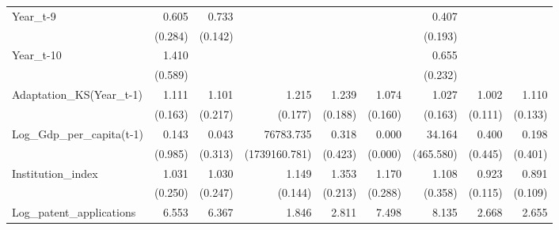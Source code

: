 \begin{table}[htbp]
\begin{tabular}{l*{8}{D{.}{.}{-1}}}
Year\_t-9            &       0.605         &       0.733\sym{\%}  &                     &                     &                     &       0.407\sym{*}  &                     &                     \\
                    &     (0.284)         &     (0.142)         &                     &                     &                     &     (0.193)         &                     &                     \\
Year\_t-10           &       1.410         &                     &                     &                     &                     &       0.655         &                     &                     \\
                    &     (0.589)         &                     &                     &                     &                     &     (0.232)         &                     &                     \\
Adaptation\_KS(Year\_t-1)&       1.111         &       1.101         &       1.215         &       1.239         &       1.074         &       1.027         &       1.002         &       1.110         \\
                    &     (0.163)         &     (0.217)         &     (0.177)         &     (0.188)         &     (0.160)         &     (0.163)         &     (0.111)         &     (0.133)         \\
Log\_Gdp\_per\_capita(t-1)&       0.143         &       0.043         &   76783.735         &       0.318         &       0.000\sym{**} &      34.164         &       0.400         &       0.198         \\
                    &     (0.985)         &     (0.313)         &(1739160.781)         &     (0.423)         &     (0.000)         &   (465.580)         &     (0.445)         &     (0.401)         \\
Institution\_index   &       1.031         &       1.030         &       1.149         &       1.353\sym{*}  &       1.170         &       1.108         &       0.923         &       0.891         \\
                    &     (0.250)         &     (0.247)         &     (0.144)         &     (0.213)         &     (0.288)         &     (0.358)         &     (0.115)         &     (0.109)         \\
Log\_patent\_applications&       6.553\sym{***}&       6.367\sym{***}&       1.846         &       2.811\sym{***}&       7.498\sym{***}&       8.135\sym{**} &       2.668\sym{***}&       2.655\sym{***}\\

\end{tabular}
\end{table}
